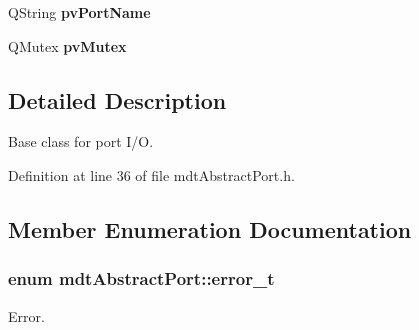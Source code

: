 \begin{DoxyCompactItemize}
\item 
\hypertarget{classmdt_abstract_port_afb8f8a723ff2db5141f18750020a7ee9}{
QString {\bfseries pvPortName}}
\label{classmdt_abstract_port_afb8f8a723ff2db5141f18750020a7ee9}

\item 
\hypertarget{classmdt_abstract_port_a357bce65bc031fffa87090a26ab88a08}{
QMutex {\bfseries pvMutex}}
\label{classmdt_abstract_port_a357bce65bc031fffa87090a26ab88a08}

\end{DoxyCompactItemize}


\subsection{Detailed Description}
Base class for port I/O. 

Definition at line 36 of file mdtAbstractPort.h.



\subsection{Member Enumeration Documentation}
\hypertarget{classmdt_abstract_port_ad4121bb930c95887e77f8bafa065a85e}{
\subsubsection[{error\_\-t}]{\setlength{\rightskip}{0pt plus 5cm}enum {\bf mdtAbstractPort::error\_\-t}}}
\label{classmdt_abstract_port_ad4121bb930c95887e77f8bafa065a85e}


Error. 


